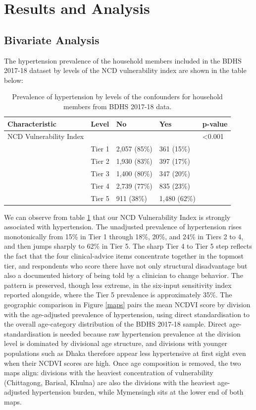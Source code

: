 \documentclass[
  12pt,
  a4paper]{article}
\begin{document}
\section{Results and Analysis}\label{results-and-analysis}

\subsection{Bivariate Analysis}\label{bivariate-analysis}

The hypertension prevalence of the household members included in the BDHS 2017-18 dataset by levels of the NCD vulnerability index are shown in the table below:

\begin{longtable}[t]{lllll}
\caption{\label{tab:bitab}Prevalence of hypertension by levels of the confounders for household members from BDHS 2017-18 data.}\\
\toprule
Characteristic & Level & No & Yes & p-value\\
\midrule
NCD Vulnerability Index &  &  &  & <0.001\\
 & Tier 1 & 2,057 (85\%) & 361 (15\%) & \\
 & Tier 2 & 1,930 (83\%) & 397 (17\%) & \\
 & Tier 3 & 1,400 (80\%) & 347 (20\%) & \\
 & Tier 4 & 2,739 (77\%) & 835 (23\%) & \\
 & Tier 5 & 911 (38\%) & 1,480 (62\%) & \\
\bottomrule
\end{longtable}

We can observe from table \ref{tab:bitab} that our NCD Vulnerability Index is strongly associated with hypertension. The unadjusted prevalence of hypertension rises monotonically from 15\% in Tier 1 through 18\%, 20\%, and 24\% in Tiers 2 to 4, and then jumps sharply to 62\% in Tier 5. The sharp Tier 4 to Tier 5 step reflects the fact that the four clinical-advice items concentrate together in the topmost tier, and respondents who score there have not only structural disadvantage but also a documented history of being told by a clinician to change behavior. The pattern is preserved, though less extreme, in the six-input sensitivity index reported alongside, where the Tier 5 prevalence is approximately 35\%. The geographic comparison in Figure \ref{maps} pairs the mean NCDVI score by division with the age-adjusted prevalence of hypertension, using direct standardisation to the overall age-category distribution of the BDHS 2017-18 sample. Direct age-standardisation is needed because raw hypertension prevalence at the division level is dominated by divisional age structure, and divisions with younger populations such as Dhaka therefore appear less hypertensive at first sight even when their NCDVI scores are high. Once age composition is removed, the two maps align: divisions with the heaviest concentration of vulnerability (Chittagong, Barisal, Khulna) are also the divisions with the heaviest age-adjusted hypertension burden, while Mymensingh sits at the lower end of both maps.

\end{document}
